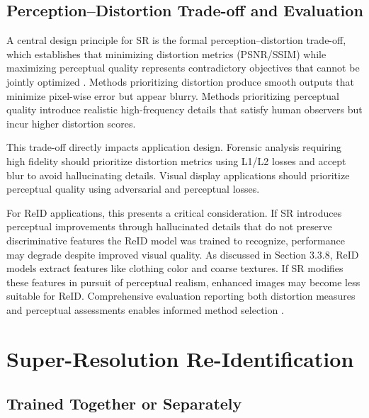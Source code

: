 \subsection{Perception–Distortion Trade-off and Evaluation}

A central design principle for SR is the formal perception–distortion trade-off, which establishes that minimizing distortion metrics (PSNR/SSIM) while maximizing perceptual quality represents contradictory objectives that cannot be jointly optimized \cite{Blau2018PerceptionDistortion}. Methods prioritizing distortion produce smooth outputs that minimize pixel-wise error but appear blurry. Methods prioritizing perceptual quality introduce realistic high-frequency details that satisfy human observers but incur higher distortion scores.

This trade-off directly impacts application design. Forensic analysis requiring high fidelity should prioritize distortion metrics using L1/L2 losses and accept blur to avoid hallucinating details. Visual display applications should prioritize perceptual quality using adversarial and perceptual losses.

For ReID applications, this presents a critical consideration. If SR introduces perceptual improvements through hallucinated details that do not preserve discriminative features the ReID model was trained to recognize, performance may degrade despite improved visual quality. As discussed in Section 3.3.8, ReID models extract features like clothing color and coarse textures. If SR modifies these features in pursuit of perceptual realism, enhanced images may become less suitable for ReID. Comprehensive evaluation reporting both distortion measures and perceptual assessments enables informed method selection \cite{Zhang2018LPIPS,Mittal2013NIQE,Wang2004SSIM}.

\section{Super-Resolution Re-Identification}

\subsection{Trained Together or Separately}

\subsection{}


